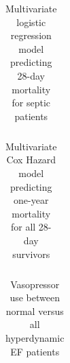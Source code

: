 \documentclass[final,10pt]{elsarticle}
\begin{document}
\begin{table}[t]
\begin{tabular}{l c c c}
\toprule

\bottomrule
\end{tabular}
\caption{Multivariate logistic regression model predicting 28-day mortality for septic patients}
\label{tbl:acute-charac}
\end{table}

\begin{table}[h]
\begin{tabular}{l c c}
\toprule

\bottomrule
\end{tabular}
\caption{Multivariate Cox Hazard model predicting one-year mortality for all 28-day survivors}
\label{tbl:all-comorb}
\end{table}

\begin{table}
\begin{tabular}{l c c c}
\toprule

\bottomrule
\end{tabular}
\caption{Vasopressor use between normal versus all hyperdynamic EF patients}
\label{tbl1:hypers}
\end{table}














\end{document}
